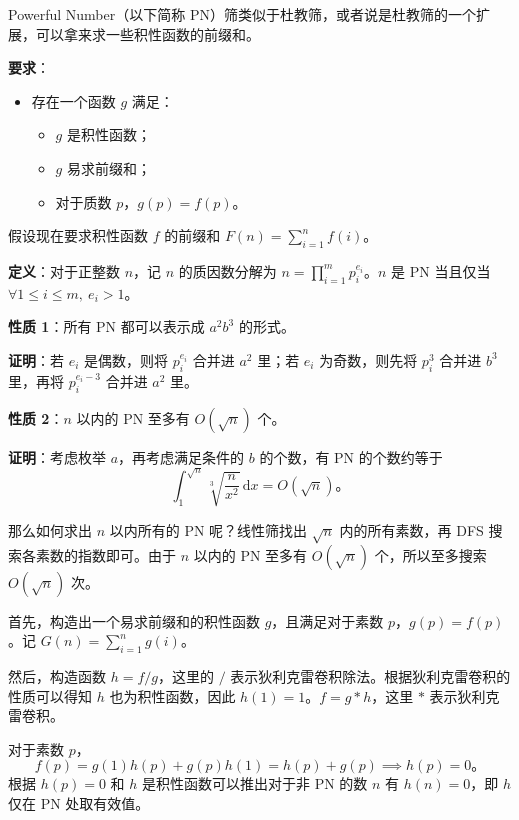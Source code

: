 Powerful Number（以下简称 PN）筛类似于杜教筛，或者说是杜教筛的一个扩展，可以拿来求一些积性函数的前缀和。

\textbf{要求}：
\begin{itemize}
    \item 存在一个函数 $g$ 满足：
    \begin{itemize}
        \item $g$ 是积性函数；
        \item $g$ 易求前缀和；
        \item 对于质数 $p$，$g(p) = f(p)$。
    \end{itemize}
\end{itemize}

假设现在要求积性函数 $f$ 的前缀和 $F(n) = \sum_{i=1}^{n} f(i)$。


\textbf{定义}：对于正整数 $n$，记 $n$ 的质因数分解为 $n = \prod_{i=1}^{m} p_i^{e_i}$。$n$ 是 PN 当且仅当 $\forall 1 \le i \le m,\ e_i > 1$。

\textbf{性质 1}：所有 PN 都可以表示成 $a^{2}b^{3}$ 的形式。

\textbf{证明}：若 $e_i$ 是偶数，则将 $p_i^{e_i}$ 合并进 $a^{2}$ 里；若 $e_i$ 为奇数，则先将 $p_i^{3}$ 合并进 $b^{3}$ 里，再将 $p_i^{e_i-3}$ 合并进 $a^{2}$ 里。

\textbf{性质 2}：$n$ 以内的 PN 至多有 $O(\sqrt{n})$ 个。

\textbf{证明}：考虑枚举 $a$，再考虑满足条件的 $b$ 的个数，有 PN 的个数约等于
\[
\int_{1}^{\sqrt{n}} \sqrt[3]{\frac{n}{x^2}} \,\mathrm{d}x = O(\sqrt{n})。
\]

那么如何求出 $n$ 以内所有的 PN 呢？线性筛找出 $\sqrt{n}$ 内的所有素数，再 DFS 搜索各素数的指数即可。由于 $n$ 以内的 PN 至多有 $O(\sqrt{n})$ 个，所以至多搜索 $O(\sqrt{n})$ 次。


首先，构造出一个易求前缀和的积性函数 $g$，且满足对于素数 $p$，$g(p) = f(p)$。记 $G(n) = \sum_{i=1}^{n} g(i)$。

然后，构造函数 $h = f / g$，这里的 $/$ 表示狄利克雷卷积除法。根据狄利克雷卷积的性质可以得知 $h$ 也为积性函数，因此 $h(1) = 1$。$f = g * h$，这里 $*$ 表示狄利克雷卷积。

对于素数 $p$，
\[
f(p) = g(1)h(p) + g(p)h(1) = h(p) + g(p) \implies h(p) = 0。
\]
根据 $h(p)=0$ 和 $h$ 是积性函数可以推出对于非 PN 的数 $n$ 有 $h(n) = 0$，即 $h$ 仅在 PN 处取有效值。

